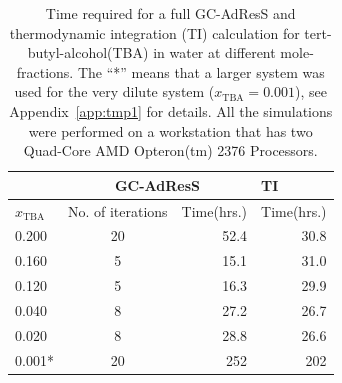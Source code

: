 \documentclass[a4paper,preprint,unsortedaddress]{revtex4-1}
\newcommand{\concenttba}{x_{\textrm{TBA}}}
\begin{document}
{\begin{table}[htpb]
\begin{center}
\begin{tabular}{|l|c|r|r|}
\hline
 &\multicolumn{2}{c|}{GC-AdResS}&\multicolumn{1}{l|}{TI}\\
 \hline
$\concenttba$ &No. of iterations&Time(hrs.)&Time(hrs.)\\
\hline
0.200 & 20 & 52.4 & 30.8 \\
0.160 & 5 & 15.1 & 31.0 \\
0.120 & 5 & 16.3 & 29.9 \\
0.040 & 8 & 27.2 & 26.7 \\
0.020 & 8 & 28.8 & 26.6 \\  
0.001* & 20 & 252 & 202 \\
\hline
\end{tabular}
\caption{Time required for a full GC-AdResS and thermodynamic
  integration (TI) calculation for tert-butyl-alcohol(TBA) in water at
  different mole-fractions.
  The ``*'' means that a larger system was used for  the very dilute system ($\concenttba=0.001$), see Appendix~\ref{app:tmp1} for details.
  All the simulations were performed on a
  workstation that has two Quad-Core AMD Opteron(tm) 2376 Processors.
}
\label{table3}
\end{center}
\end{table}
}
\end{document}
